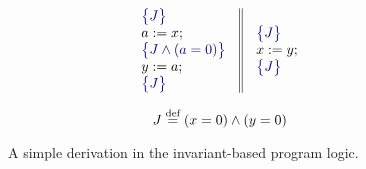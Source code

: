 \begin{figure}[t]
\centering
\small
\begin{minipage}{0.55\columnwidth}
 \[
\begin{array}{c}
\begin{array}{c||c}
 \begin{array}{l}
\asrt{J } \\
a:=x; \\
\asrt{J \land (a=0)} \\
y:=a; \\
\asrt{J} 
 \end{array}&
 \begin{array}{l}
\asrt{J } \\
x:=y;  \\
\asrt{J } 
 \end{array}
 \end{array}
 \end{array}
 \]
 \end{minipage}
\begin{minipage}{0.40\columnwidth}
$$ J \stackrel{\text{def}}{=} \left( x=0\right) \land \left(y=0\right)$$ 
 \end{minipage}
\caption{A simple derivation in the invariant-based program logic.}
\label{fig:logic}
\end{figure}


%
%
%
%
%
%
%




